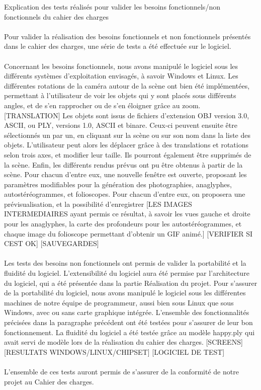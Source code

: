 Explication des tests réalisés pour valider les besoins fonctionnels/non fonctionnels du cahier des charges

\paragraph{}
Pour valider la réalisation des besoins fonctionnels et non fonctionnels présentés dans le cahier des charges, une série de tests a été effectuée sur le logiciel.

\paragraph{}
Concernant les besoins fonctionnels, nous avons manipulé le logiciel sous les différents systèmes d'exploitation envisagés, à savoir Windows et Linux.
Les différentes rotations de la caméra autour de la scène ont bien été implémentées, permettant à l'utilisateur de voir les objets qui y sont placés sous différents angles, et de s'en rapprocher ou de s'en éloigner grâce au zoom.
[TRANSLATION]
Les objets sont issus de fichiers d'extension OBJ version 3.0, ASCII, ou PLY, versions 1.0, ASCII et binare. Ceux-ci peuvent ensuite être sélectionnés un par un, en cliquant sur la scène ou sur son nom dans la liste des objets. L'utilisateur peut alors les déplacer grâce à des translations et rotations selon trois axes, et modifier leur taille. Ils pourront également être supprimés de la scène.
Enfin, les différents rendus prévus ont pu être obtenus à partir de la scène. Pour chacun d'entre eux, une nouvelle fenêtre est ouverte, proposant les paramètres modifiables pour la génération des photographies, anaglyphes, autostéréogrammes, et folioscopes. Pour chacun d'entre eux, on proposera une prévisualisation, et la possibilité d'enregistrer [LES IMAGES INTERMEDIAIRES ayant permis ce résultat, à savoir les vues gauche et droite pour les anaglyphes, la carte des profondeurs pour les autostéréogrammes, et chaque image du folioscope permettant d'obtenir un GIF animé.]    
[VERIFIER SI CEST OK]
[SAUVEGARDES]


\paragraph{}
Les tests des besoins non fonctionnels ont permis de valider la portabilité et la fluidité du logiciel. L'extensibilité du logiciel aura été permise par l'architecture du logiciel, qui a été présentée dans la partie Réalisation du projet.
Pour s'assurer de la portabilité du logiciel, nous avons manipulé le logiciel sous les différentes machines de notre équipe de programmeur, aussi bien sous Linux que sous Windows, avec ou sans carte graphique intégrée. L'ensemble des fonctionnalités précisées dans la paragraphe précédent ont été testées pour s'assurer de leur bon fonctionnement.
La fluidité du logiciel a été testée grâce au modèle happy.ply qui avait servi de modèle lors de la réalisation du cahier des charges. 
[SCREENS]
[RESULTATS WINDOWS/LINUX/CHIPSET]
[LOGICIEL DE TEST]

\paragraph{}
L'ensemble de ces tests auront permis de s'assurer de la conformité de notre projet au Cahier des charges. 
